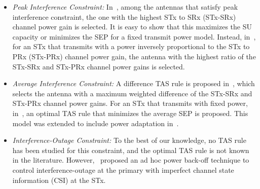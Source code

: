 \documentclass[12pt,draftcls,peerreview,onecolumn]{IEEEtran}
\begin{document}
\begin{itemize}
\item {\em Peak Interference Constraint:} In~\cite{Hanif_2015_globecom}, among the antennas that satisfy peak interference constraint, the one with the highest STx to SRx (STx-SRx) channel power gain is selected. It is easy to show that this maximizes the SU capacity or minimizes the SEP for a fixed transmit power model. Instead, in~\cite{Wang_2010_TWC}, for an  STx that transmits with a power inversely proportional to the STx to PRx (STx-PRx) channel power gain, the antenna with the highest ratio of the STx-SRx and STx-PRx channel power gains is selected. 
%
\item {\em Average Interference Constraint:} A difference TAS rule is proposed in~\cite{Wang_2011_TCom}, which selects the antenna with a maximum weighted difference of the STx-SRx and STx-PRx channel power gains. For an STx that transmits with fixed power, in~\cite{Sarvendranath_2013_TCOM}, an optimal TAS rule that minimizes the average SEP is proposed. %
This model was extended to include power adaptation in~\cite{Sarvendranath_2014_TCOM}. %



\item{\em Interference-Outage Constraint:} To the best of our knowledge, no TAS rule has been studied for this constraint, and the optimal TAS rule is not known in the literature. However,~\cite{Peng_2016_eurasip} proposed an ad hoc power back-off technique to control interference-outage at the primary with imperfect channel state information (CSI) at the STx.

\end{itemize}
\end{document}
